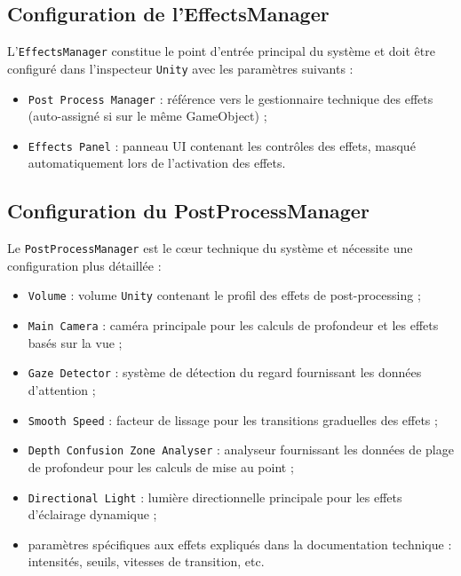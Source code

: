 \documentclass[12pt]{report}
\begin{document}
\subsection{Configuration de l'EffectsManager}
L'\texttt{EffectsManager} constitue le point d'entrée principal du système et doit être configuré dans l'inspecteur \texttt{Unity} avec les paramètres suivants :

\begin{itemize}
    \vspace{2mm}
    \item \texttt{Post Process Manager} : référence vers le gestionnaire technique des effets (auto-assigné si sur le même GameObject) ;
    \vspace{2mm}
    \item \texttt{Effects Panel} : panneau UI contenant les contrôles des effets, masqué automatiquement lors de l'activation des effets.
    \vspace{2mm}
\end{itemize}

\subsection{Configuration du PostProcessManager}
Le \texttt{PostProcessManager} est le cœur technique du système et nécessite une configuration plus détaillée :

\begin{itemize}
    \vspace{2mm}
    \item \texttt{Volume} : volume \texttt{Unity} contenant le profil des effets de post-processing ;
    \vspace{2mm}
    \item \texttt{Main Camera} : caméra principale pour les calculs de profondeur et les effets basés sur la vue ;
    \vspace{2mm}
    \item \texttt{Gaze Detector} : système de détection du regard fournissant les données d'attention ;
    \vspace{2mm}
    \item \texttt{Smooth Speed} : facteur de lissage pour les transitions graduelles des effets ;
    \vspace{2mm}
    \item \texttt{Depth Confusion Zone Analyser} : analyseur fournissant les données de plage de profondeur pour les calculs de mise au point ;
    \vspace{2mm}
    \item \texttt{Directional Light} : lumière directionnelle principale pour les effets d'éclairage dynamique ;
    \vspace{2mm}
    \item paramètres spécifiques aux effets expliqués dans la documentation technique : intensités, seuils, vitesses de transition, etc.
    \vspace{2mm}
\end{itemize}
\end{document}
